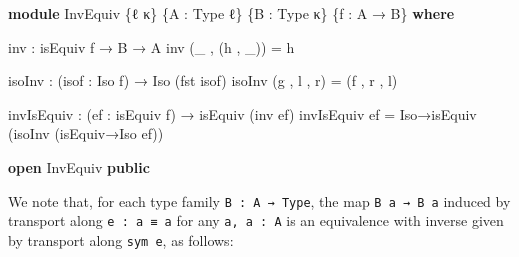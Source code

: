 \documentclass[
  11pt,
  oneside,
  article]{memoir}
\newenvironment{Shaded}{}{}
\newcommand{\KeywordTok}[1]{\textcolor[rgb]{0.00,0.44,0.13}{\textbf{#1}}}
\newcommand{\NormalTok}[1]{#1}
\newcommand{\OtherTok}[1]{\textcolor[rgb]{0.00,0.44,0.13}{#1}}
\theoremstyle{definition}
\theoremstyle{plain}
\newcommand{\0}{\textsf{0}}
\newcommand{\1}{\tn{\textsf{1}}}
\begin{document}
\begin{Shaded}
\begin{Highlighting}[]
\KeywordTok{module}\NormalTok{ InvEquiv }\OtherTok{\{}\NormalTok{ℓ κ}\OtherTok{\}} \OtherTok{\{}\NormalTok{A }\OtherTok{:}\NormalTok{ Type ℓ}\OtherTok{\}} \OtherTok{\{}\NormalTok{B }\OtherTok{:}\NormalTok{ Type κ}\OtherTok{\}} \OtherTok{\{}\NormalTok{f }\OtherTok{:}\NormalTok{ A }\OtherTok{→}\NormalTok{ B}\OtherTok{\}} \KeywordTok{where}

\NormalTok{    inv }\OtherTok{:}\NormalTok{ isEquiv f }\OtherTok{→}\NormalTok{ B }\OtherTok{→}\NormalTok{ A}
\NormalTok{    inv }\OtherTok{(\_}\NormalTok{ , }\OtherTok{(}\NormalTok{h , }\OtherTok{\_))} \OtherTok{=}\NormalTok{ h}

\NormalTok{    isoInv }\OtherTok{:} \OtherTok{(}\NormalTok{isof }\OtherTok{:}\NormalTok{ Iso f}\OtherTok{)} \OtherTok{→}\NormalTok{ Iso }\OtherTok{(}\NormalTok{fst isof}\OtherTok{)}
\NormalTok{    isoInv }\OtherTok{(}\NormalTok{g , l , r}\OtherTok{)} \OtherTok{=} \OtherTok{(}\NormalTok{f , r , l}\OtherTok{)}

\NormalTok{    invIsEquiv }\OtherTok{:} \OtherTok{(}\NormalTok{ef }\OtherTok{:}\NormalTok{ isEquiv f}\OtherTok{)} \OtherTok{→}\NormalTok{ isEquiv }\OtherTok{(}\NormalTok{inv ef}\OtherTok{)}
\NormalTok{    invIsEquiv ef }\OtherTok{=}\NormalTok{ Iso→isEquiv }\OtherTok{(}\NormalTok{isoInv }\OtherTok{(}\NormalTok{isEquiv→Iso ef}\OtherTok{))}
    
\KeywordTok{open}\NormalTok{ InvEquiv }\KeywordTok{public}
\end{Highlighting}
\end{Shaded}

We note that, for each type family \texttt{B\ :\ A\ →\ Type}, the map
\texttt{B\ a\ →\ B\ a\textquotesingle{}} induced by transport along
\texttt{e\ :\ a\ ≡\ a\textquotesingle{}} for any
\texttt{a,\ a\textquotesingle{}\ :\ A} is an equivalence with inverse
given by transport along \texttt{sym\ e}, as follows:
\end{document}
